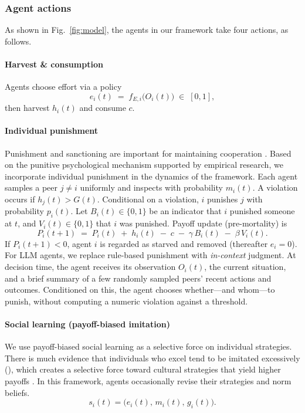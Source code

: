 \documentclass[sigconf]{aamas}
\newcommand{\figref}[1]{Fig.~\ref{#1}}
\begin{document}
\subsubsection{\textbf{Agent actions}}

As shown in \figref{fig:model}, the agents in our framework take four actions, as follows.

\paragraph{Harvest \& consumption}
Agents choose effort via a policy
\[
e_i(t)\;=\;f_{E,i}\big(O_i(t)\big)\;\in\;[0,1],
\]
then harvest $h_i(t)$ and consume $c$.

\paragraph{Individual punishment}
Punishment and sanctioning are important for maintaining cooperation \cite{ostrom1999design,price2002punitive,henrich2001people}. 
Based on the punitive psychological mechanism supported by empirical research, we incorporate individual punishment in the dynamics of the framework. 
Each agent samples a peer $j\!\neq\! i$ uniformly and inspects with probability $m_i(t)$. 
A violation occurs if $h_j(t) > G(t)$.
Conditional on a violation, $i$ punishes $j$ with probability $p_i(t)$. Let $B_i(t)\in\{0,1\}$ be an indicator that $i$ punished someone at $t$, and $V_i(t)\in\{0,1\}$ that $i$ was punished. Payoff update (pre-mortality) is
\[
P_i(t\!+\!1)\;=\;P_i(t)\;+\;h_i(t)\;-\;c\;-\;\gamma\,B_i(t)\;-\;\beta\,V_i(t).
\]
If $P_i(t\!+\!1)<0$, agent $i$ is regarded as starved and removed (thereafter $e_i\!=\!0$).
For LLM agents, we replace rule-based punishment with \emph{in-context} judgment. 
At decision time, the agent receives its observation $O_i(t)$, the current situation, and a brief summary of a few randomly sampled peers' recent actions and outcomes. 
Conditioned on this, the agent chooses whether---and whom---to punish, without computing a numeric violation against a threshold.


\paragraph{Social learning (payoff-biased imitation)}
We use payoff-biased social learning as a selective force on individual strategies. There is much evidence that individuals who excel tend to be imitated excessively (\cite{henrich2001evolution}), which creates a selective force toward cultural strategies that yield higher payoffs \cite{mcelreath2008beyond,andrews2024cultural}.
In this framework, agents occasionally revise their strategies and norm beliefs. 
\[
s_i(t) = \big(e_i(t),\,m_i(t), \,g_i(t)\big).
\]
\end{document}
